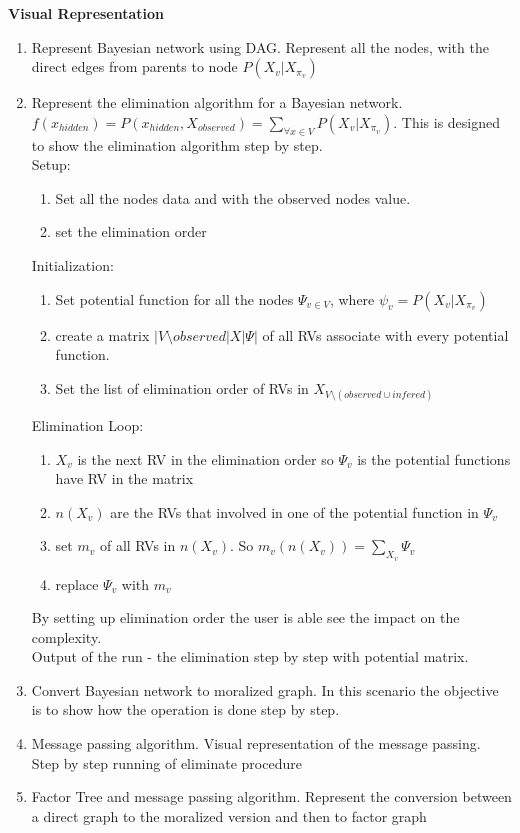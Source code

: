 \documentclass{article}
\begin{document}
    \textbf{Visual Representation}\\
    \begin{enumerate}
        \item Represent Bayesian network using DAG. Represent all the nodes, with the direct edges from parents to node $P(X_v | X_{\pi_v})$
        \item Represent the elimination algorithm for a Bayesian network. $f(x_{hidden})=P(x_{hidden},X_{observed})=\sum_{\forall x \in V}P(X_v|X_{\pi_v})$. This is designed to show the elimination algorithm step by step.\\
        Setup:\\
        \begin{enumerate}
            \item Set all the nodes data and with the observed nodes value.
            \item set the elimination order
        \end{enumerate}
        Initialization:\\
        \begin{enumerate}
            \item Set potential function for all the nodes $\Psi_{v \in V}$, where $\psi_v = P(X_v|X_{\pi_v})$
            \item create a matrix $|V\setminus observed| X |\Psi|$ of all RVs associate with every potential function.
            \item Set the list of elimination order of RVs in $X_{V\setminus (observed \cup infered)}$
        \end{enumerate}
        Elimination Loop:\\
        \begin{enumerate}
            \item $X_v$ is the next RV in the elimination order so $\Psi_v$ is the potential functions have RV in the matrix
            \item $n(X_v)$ are the RVs that involved in one of the potential function in $\Psi_v$
            \item set $m_v$ of all RVs in $n(X_v)$. So $m_v(n(X_v))=\sum_{X_v}\Psi_v$
            \item replace $\Psi_v$ with $m_v$
        \end{enumerate}
        By setting up elimination order the user is able see the impact on the complexity.\\
        Output of the run - the elimination step by step with potential matrix.

        \item Convert Bayesian network to moralized graph. In this scenario the objective is to show how the operation is done step by step.

        \item Message passing algorithm. Visual representation of the message passing. Step by step running of eliminate procedure

        \item Factor Tree and message passing algorithm. Represent the conversion between a direct graph to the moralized version and then to factor graph
    \end{enumerate}
\end{document}
